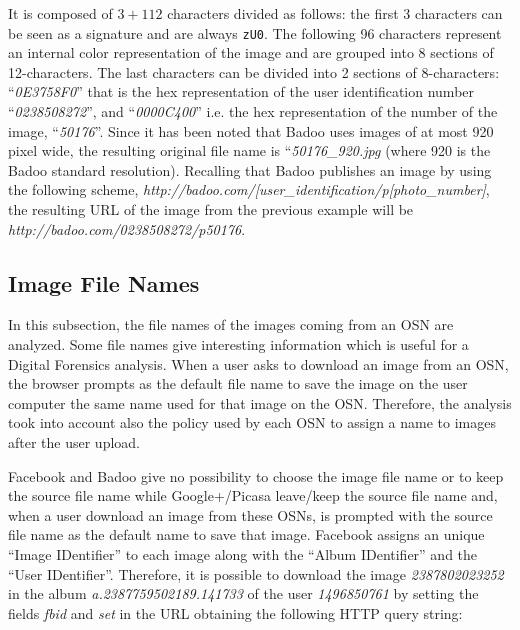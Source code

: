 \documentclass[10pt, conference]{IEEEtran}
\begin{document}
\noindent It is composed of $3+112$ characters divided as follows: the first 3 characters can be seen as a signature and are always \verb=zU0=. 
The following 96 characters represent an internal color representation of the image and are grouped into 8 sections of 12-characters. The last characters can be divided into 2 sections of 8-characters: ``{\sl 0E3758F0}'' that is the hex representation of the user identification number ``{\sl 0238508272}'', and ``{\sl0000C400}'' i.e. the hex representation of the number of the image, ``{\sl50176}''. Since it has been noted that Badoo uses images of at most 920 pixel wide, the resulting original file name is ``{\sl50176\_920.jpg} (where 920 is the Badoo standard resolution).
Recalling that Badoo publishes an image by using the following scheme,
{\sl http://badoo.com/[user\_identification/p[photo\_number]}, the resulting URL of the image from the previous example will be {\sl http://badoo.com/0238508272/p50176}.


\subsection{Image File Names}
In this subsection, the file names of the images coming from an OSN are analyzed.
Some file names give interesting information which is useful for a Digital
Forensics analysis. When a user asks to download an image from an OSN, the browser prompts as the default file name to save the image on the user computer the same name used for that image on the OSN. Therefore, the analysis took into account also the policy used by each OSN to assign a name to images after the user upload.
 
Facebook and Badoo give no possibility to choose the image file name or to keep the source file name while Google+/Picasa leave/keep the source file name and, when a user download an image from these OSNs, is prompted with the source file name as the default name to save that image. Facebook assigns an unique ``Image IDentifier'' to each image along with the ``Album IDentifier'' and the ``User IDentifier''. Therefore, it is possible to download the image {\sl 2387802023252} in the album {\sl a.2387759502189.141733} of the user {\sl 1496850761} by setting the fields {\sl fbid} and {\sl set} in the URL obtaining the following HTTP query string:
\end{document}
